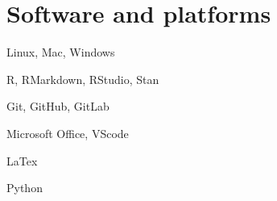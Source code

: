 \documentclass[letterpaper]{resume_config}
\begin{document}
\section{Software and platforms}
\begin{SkillsList}
	\item Linux, Mac, Windows  
	\item R, RMarkdown, RStudio, Stan 
	\item Git, GitHub, GitLab 
	\item Microsoft Office, VScode
	\item LaTex
	\item Python 
\end{SkillsList}
%
%
%
\end{document}
